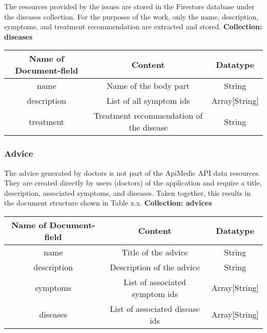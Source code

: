 The resources provided by the issues are stored in the Firestore database under the diseases collection. For the purposes of the work, only the name, description, symptoms, and treatment recommendation are extracted and stored.
\newline
\textbf{Collection: diseases}
\begin{center}
	\begin{tabular}{ | c| c| c | } 
		\hline
		Name of Document-field& Content & Datatype \\ 
		\hline
		name & Name of the body part & String \\ 
		\hline
		description & List of all symptom ids & Array[String] \\ 
		\hline
		treatment & Treatment recommendation of the disease & String \\ 
		\hline
	\end{tabular}
\end{center}
\subsubsection{Advice}
The advice generated by doctors is not part of the ApiMedic API data resources. They are created directly by users (doctors) of the application and require a title, description, associated symptoms, and diseases. Taken together, this results in the document structure shown in Table x.x.
\textbf{Collection: advices}
\begin{center}
	\begin{tabular}{ | c| c| c | } 
		\hline
		Name of Document-field& Content & Datatype \\ 
		\hline
		name & Title of the advice& String \\ 
		\hline
		description & Description of the advice & String \\ 
		\hline
		symptoms & List of associated symptom ids & Array[String]\\ 
		\hline
		diseases & List of associated disease ids & Array[String]\\ 
		\hline
	\end{tabular}
\end{center}

